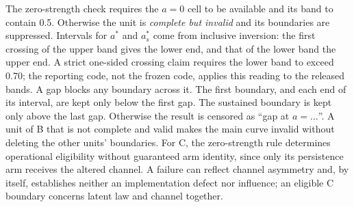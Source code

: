 The zero-strength check requires the $a=0$ cell to be available and its band to contain 0.5. Otherwise the unit is \emph{complete but invalid} and its boundaries are suppressed. Intervals for $a^*$ and $a^*_s$ come from inclusive inversion: the first crossing of the upper band gives the lower end, and that of the lower band the upper end. A strict one-sided crossing claim requires the lower band to exceed 0.70; the reporting code, not the frozen code, applies this reading to the released bands. A gap blocks any boundary across it. The first boundary, and each end of its interval, are kept only below the first gap. The sustained boundary is kept only above the last gap. Otherwise the result is censored as ``gap at $a=\ldots$''. A unit of B that is not complete and valid makes the main curve invalid without deleting the other units' boundaries.
For C, the zero-strength rule determines operational eligibility without guaranteed arm identity, since only its persistence arm receives the altered channel. A failure can reflect channel asymmetry and, by itself, establishes neither an implementation defect nor influence; an eligible C boundary concerns latent law and channel together. %

